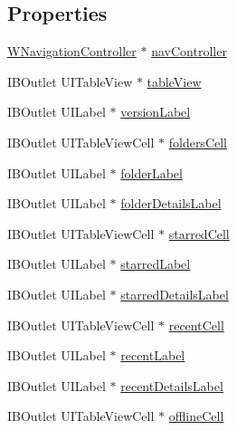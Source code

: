\subsection*{Properties}
\begin{DoxyCompactItemize}
\item 
\hyperlink{interface_w_navigation_controller}{W\-Navigation\-Controller} $\ast$ \hyperlink{interface_w_home_view_controller_a1f97b83030068313d73493a57ed5be3b}{nav\-Controller}
\item 
I\-B\-Outlet U\-I\-Table\-View $\ast$ \hyperlink{interface_w_home_view_controller_a2945bdd6a49199f1d57aeb2ca69efc7a}{table\-View}
\item 
I\-B\-Outlet U\-I\-Label $\ast$ \hyperlink{interface_w_home_view_controller_abc9706c23172fe2da2ebd7638fe64cc6}{version\-Label}
\item 
I\-B\-Outlet U\-I\-Table\-View\-Cell $\ast$ \hyperlink{interface_w_home_view_controller_a020bb702f02d1f40fbbc0b60bc2d9998}{folders\-Cell}
\item 
I\-B\-Outlet U\-I\-Label $\ast$ \hyperlink{interface_w_home_view_controller_a1fcdfc5e46d4bc92f635329830527861}{folder\-Label}
\item 
I\-B\-Outlet U\-I\-Label $\ast$ \hyperlink{interface_w_home_view_controller_a6a30d2d9cdf090aaf691e18cc790b627}{folder\-Details\-Label}
\item 
I\-B\-Outlet U\-I\-Table\-View\-Cell $\ast$ \hyperlink{interface_w_home_view_controller_ab50671f402a81807986bebbbb3ca3a94}{starred\-Cell}
\item 
I\-B\-Outlet U\-I\-Label $\ast$ \hyperlink{interface_w_home_view_controller_a95c8494cfd0d8f02724017b7788103ce}{starred\-Label}
\item 
I\-B\-Outlet U\-I\-Label $\ast$ \hyperlink{interface_w_home_view_controller_a614741eedf36b080666e12c556d5ae00}{starred\-Details\-Label}
\item 
I\-B\-Outlet U\-I\-Table\-View\-Cell $\ast$ \hyperlink{interface_w_home_view_controller_a12010a5f8c1e84ba4e7deb373cb32901}{recent\-Cell}
\item 
I\-B\-Outlet U\-I\-Label $\ast$ \hyperlink{interface_w_home_view_controller_a77429b9c1a0fa9168c6f4b751ac0deb9}{recent\-Label}
\item 
I\-B\-Outlet U\-I\-Label $\ast$ \hyperlink{interface_w_home_view_controller_a65480f491be3be8166019965ceb5535e}{recent\-Details\-Label}
\item 
I\-B\-Outlet U\-I\-Table\-View\-Cell $\ast$ \hyperlink{interface_w_home_view_controller_a2482fd0e7a0490b34182120517f84c04}{offline\-Cell}

\end{DoxyCompactItemize}
